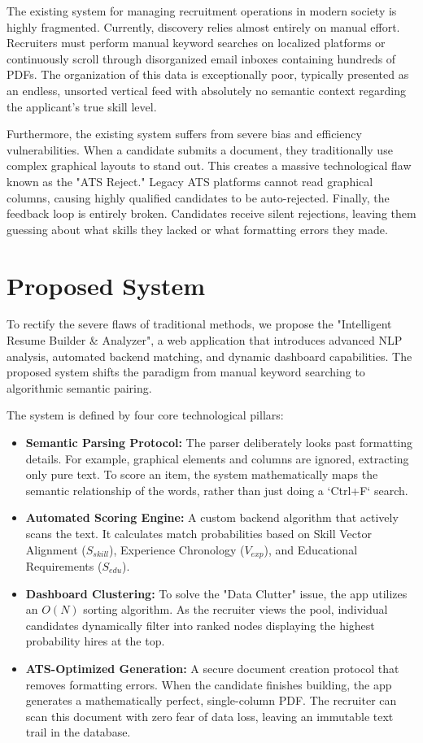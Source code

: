 \documentclass[12pt,a4paper]{report}
\begin{document}
The existing system for managing recruitment operations in modern society is highly fragmented. Currently, discovery relies almost entirely on manual effort. Recruiters must perform manual keyword searches on localized platforms or continuously scroll through disorganized email inboxes containing hundreds of PDFs. The organization of this data is exceptionally poor, typically presented as an endless, unsorted vertical feed with absolutely no semantic context regarding the applicant's true skill level.

Furthermore, the existing system suffers from severe bias and efficiency vulnerabilities. When a candidate submits a document, they traditionally use complex graphical layouts to stand out. This creates a massive technological flaw known as the "ATS Reject." Legacy ATS platforms cannot read graphical columns, causing highly qualified candidates to be auto-rejected. Finally, the feedback loop is entirely broken. Candidates receive silent rejections, leaving them guessing about what skills they lacked or what formatting errors they made.

\section{Proposed System}

To rectify the severe flaws of traditional methods, we propose the "Intelligent Resume Builder \& Analyzer", a web application that introduces advanced NLP analysis, automated backend matching, and dynamic dashboard capabilities. The proposed system shifts the paradigm from manual keyword searching to algorithmic semantic pairing.

The system is defined by four core technological pillars:

\begin{itemize}
    \item \textbf{Semantic Parsing Protocol:} The parser deliberately looks past formatting details. For example, graphical elements and columns are ignored, extracting only pure text. To score an item, the system mathematically maps the semantic relationship of the words, rather than just doing a `Ctrl+F` search.
    \item \textbf{Automated Scoring Engine:} A custom backend algorithm that actively scans the text. It calculates match probabilities based on Skill Vector Alignment ($S_{skill}$), Experience Chronology ($V_{exp}$), and Educational Requirements ($S_{edu}$). 
    \item \textbf{Dashboard Clustering:} To solve the "Data Clutter" issue, the app utilizes an $O(N)$ sorting algorithm. As the recruiter views the pool, individual candidates dynamically filter into ranked nodes displaying the highest probability hires at the top.
    \item \textbf{ATS-Optimized Generation:} A secure document creation protocol that removes formatting errors. When the candidate finishes building, the app generates a mathematically perfect, single-column PDF. The recruiter can scan this document with zero fear of data loss, leaving an immutable text trail in the database.
\end{itemize}
\end{document}
